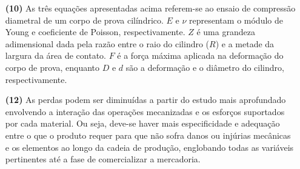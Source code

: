 \documentclass[a4paper, 12pt]{article}
\begin{document}
\begin{itemize}
		\item[\textbf{(10)}] As três equações apresentadas acima referem-se ao ensaio de compressão diametral de um corpo de prova cilíndrico. $E$ e $\nu$ representam o módulo de Young e coeficiente de Poisson, respectivamente. $Z$ é uma grandeza adimensional dada pela razão entre o raio do cilindro ($R$) e a metade da largura da área de contato. $F$ é a força máxima aplicada na deformação do corpo de prova, enquanto $D$ e $d$ são a deformação e o diâmetro do cilindro, respectivamente.
		
		\item[\textbf{(12)}] As perdas podem ser diminuídas a partir do estudo mais aprofundado envolvendo a interação das operações mecanizadas e os esforços suportados por cada material. Ou seja, deve-se haver mais especificidade e adequação entre o que o produto requer para que não sofra danos ou injúrias mecânicas e os elementos ao longo da cadeia de produção, englobando todas as variáveis pertinentes até a fase de comercializar a mercadoria.
	\end{itemize} 
\end{document}
